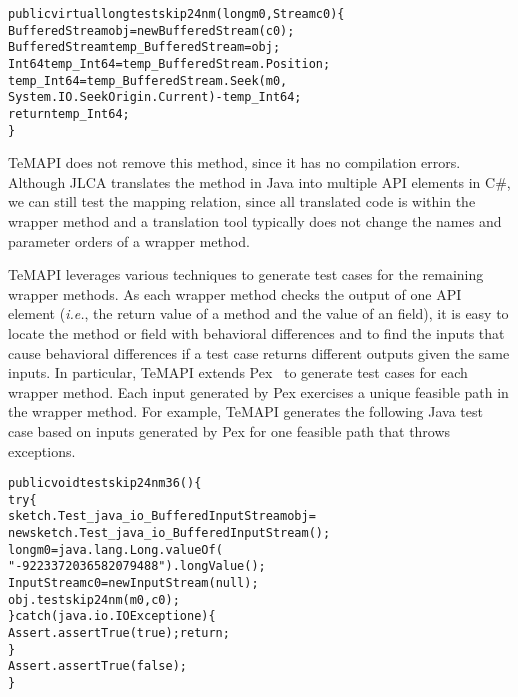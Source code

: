 \begin{CodeOut}\vspace*{-1ex}
\begin{alltt}
public virtual long testskip24nm(long m0, Stream c0)\{
  BufferedStream obj = new BufferedStream(c0);
  BufferedStream temp_BufferedStream = obj;
  Int64 temp_Int64 = temp_BufferedStream.Position;
  temp_Int64 = temp_BufferedStream.Seek(m0,
       System.IO.SeekOrigin.Current) - temp_Int64;
  return temp_Int64;
\}
\end{alltt}
\end{CodeOut}\vspace*{-2ex}

TeMAPI does not remove this method, since it has no compilation errors. Although JLCA translates the  method in Java into multiple API elements in C\#, we can still test the mapping relation, since all translated code is within the wrapper method and a translation tool typically does not change the names and parameter orders of a wrapper method.

TeMAPI leverages various techniques to generate test cases for the remaining wrapper methods. As each wrapper method checks the output of one API element (\emph{i.e.}, the return value of a method and the value of an field), it is easy to locate the method or field with behavioral differences and to find the inputs that cause behavioral differences if a test case returns different outputs given the same inputs. In particular, TeMAPI extends Pex~\cite{tillmann2008pex} to generate test cases for each wrapper method. Each input generated by Pex exercises a unique feasible path in the wrapper method. For example, TeMAPI generates the following Java test case based on inputs generated by Pex for one feasible path that throws exceptions.

\begin{CodeOut}\vspace*{-1ex}
\begin{alltt}
public void testskip24nm36()\{
  try\{
     sketch.Test_java_io_BufferedInputStream obj =
        new sketch.Test_java_io_BufferedInputStream();
     long m0 = java.lang.Long.valueOf(
                  "-9223372036582079488").longValue();
     InputStream c0 = new InputStream(null);
     obj.testskip24nm(m0,c0);
  \}catch(java.io.IOException e)\{
     Assert.assertTrue(true);return;
  \}
  Assert.assertTrue(false);
\}
\end{alltt}
\end{CodeOut}\vspace*{-2ex}

